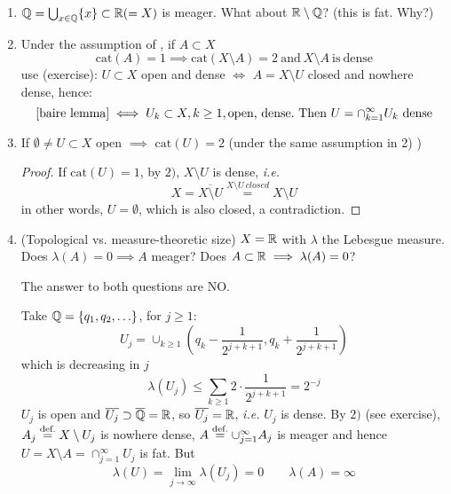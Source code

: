 \documentclass{article}
\begin{document}
\begin{remark}
\label{Baire remark}
\begin{enumerate}[1)]
    \item $\mathbb{Q} = \bigcup_{x\in \mathbb{Q}} \{x\} \subset \mathbb{R} (=X)$ is meager. What about $\mathbb{R} \setminus \mathbb{Q}$? (this is fat. Why?)
    \item Under the assumption of , if $A\subset X$  
    $$\text{cat}(A)=1 \implies \text{cat}(X \setminus A)=2 \ \text{and} \ X\setminus A \ \text{is} \ \text{dense}$$
    use (exercise): $U \subset X$ open and dense $\iff$ $A = X\setminus U$ closed and nowhere dense, hence:  
    \begin{equation*}
        \text{\Cref{baire lemma}} \iff U_k \subset X, k\geq 1, \text{open,\ dense}. \ \text{Then} \ U = \cap_{k=1}^{\infty} U_k \ \text{dense}
    \end{equation*}
    \item If $\emptyset \neq U \subset X$ open $\implies$ $\text{cat}(U)=2$ (under the same assumption in 2) )
    \begin{proof}
        If $\text{cat}(U)=1$, by $2)$, $X\setminus U$ is dense, \textit{i.e.}  
        $$
        X = \overline{X\setminus U}\overset{X\setminus U \ closed}{=} X\setminus U
        $$
        in other words, $U=\emptyset$, which is also closed, a contradiction.
    \end{proof}
    \item (Topological vs. measure-theoretic size)  $X=\mathbb{R}$ with $\lambda$ the Lebesgue measure. Does $\lambda(A)=0 \implies A $ meager? Does $A \subset \mathbb{R} \implies \lambda(A)=0$?  

    The answer to both questions are NO.  
    
    Take $\mathbb{Q} = \{q_1, q_2, \ldots\}$, for $j\geq 1$:  
    $$
    U_j = \cup_{k\geq 1} (q_k - \frac{1}{2^{j+k+1}}, q_k + \frac{1}{2^{j+k+1}})
    $$ 
    which is decreasing in $j$  
    $$
    \lambda(U_j) \leq \sum_{k\geq 1} 2 \cdot \frac{1}{2^{j+k+1}} = 2^{-j}
    $$
    $U_j$ is open and $\overline{U_j} \supset \overline{\mathbb{Q}} = \mathbb{R}$, so $\overline{U_j} = \mathbb{R}$, \textit{i.e.} $U_j$ is dense.  
    By $2)$ (see exercise), $A_j \stackrel{\text{def.}}{=} X \setminus U_j$ is nowhere dense, $A \stackrel{\text{def.}}{=} \cup_{j=1}^{\infty} A_j$ is meager and hence $U = X\setminus A=\cap_{j=1}^{\infty} U_j$ is fat. But  
    $$
    \lambda(U) = \lim_{j\to \infty} \lambda(U_j) = 0 \qquad \lambda(A)=\infty
    $$
\end{enumerate}
\end{remark}
\end{document}
